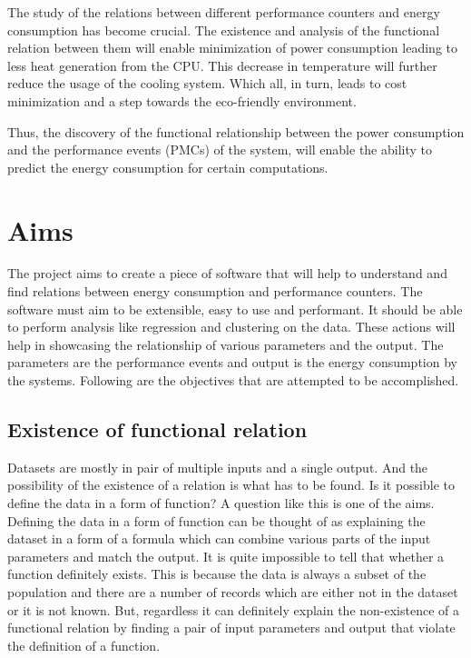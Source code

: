 The study of the relations between different performance counters and energy consumption has become crucial. The existence and analysis of the functional relation between them will enable minimization of power consumption leading to less heat generation from the CPU. This decrease in temperature will further reduce the usage of the cooling system. Which all, in turn, leads to cost minimization and a step towards the eco-friendly environment.

Thus, the discovery of the functional relationship between the power consumption and the performance events (PMCs) of the system, will enable the ability to predict the energy consumption for certain computations.

\section{Aims}

The project aims to create a piece of software that will help to understand and find relations between energy consumption and performance counters. The software must aim to be extensible, easy to use and performant. It should be able to perform analysis like regression and clustering on the data. These actions will help in showcasing the relationship of various parameters and the output. The parameters are the performance events and output is the energy consumption by the systems. Following are the objectives that are attempted to be accomplished.

\subsection{Existence of functional relation}

Datasets are mostly in pair of multiple inputs and a single output. And the possibility of the existence of a relation is what has to be found. Is it possible to define the data in a form of function? A question like this is one of the aims. Defining the data in a form of function can be thought of as explaining the dataset in a form of a formula which can combine various parts of the input parameters and match the output. It is quite impossible to tell that whether a function definitely exists. This is because the data is always a subset of the population and there are a number of records which are either not in the dataset or it is not known. But, regardless it can definitely explain the non-existence of a functional relation by finding a pair of input parameters and output that violate the definition of a function.

